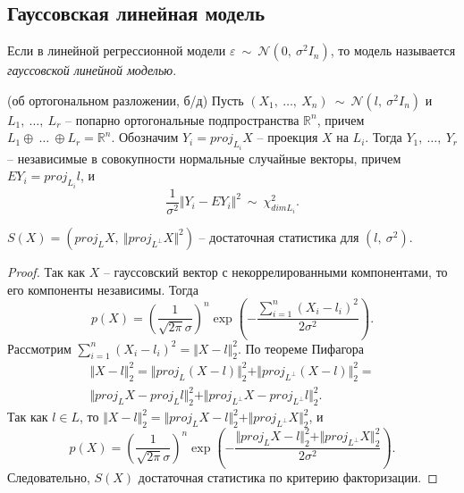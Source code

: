 \subsection{Гауссовская линейная модель}
\begin{definition}
    Если в линейной регрессионной модели $\displaystyle \varepsilon \ \sim \ \mathcal{N}\left( 0,\ \sigma ^{2} I_{n}\right)$, то модель называется \textit{гауссовской линейной моделью}.
\end{definition}
\begin{theorem}
    (об ортогональном разложении, б/д) Пусть $\displaystyle ( X_{1} ,\ \dotsc ,\ X_{n}) \ \sim \ \mathcal{N}\left( l,\ \sigma ^{2} I_{n}\right)$ и $\displaystyle L_{1} ,\ \dotsc ,\ L_{r}$ -- попарно ортогональные подпространства $\displaystyle \mathbb{R}^{n}$, причем $\displaystyle L_{1} \oplus \ \dotsc \ \oplus L_{r} =\mathbb{R}^{n}$. Обозначим $\displaystyle Y_{i} =proj_{L_{i}} X$ -- проекция $\displaystyle X$ на $\displaystyle L_{i}$. Тогда $\displaystyle Y_{1} ,\ \dotsc ,\ Y_{r}$ -- независимые в совокупности нормальные случайные векторы, причем $\displaystyle EY_{i} =proj_{L_{i}} l$, и
    \begin{equation*}
        \dfrac{1}{\sigma ^{2}}\Vert Y_{i} -EY_{i}\Vert ^{2} \ \sim \ \chi _{dimL_{i}}^{2} .
    \end{equation*}
\end{theorem}
\begin{proposition}
    $\displaystyle S( X) =\left( proj_{L} X,\ \Vert proj_{L^{\perp }} X\Vert ^{2}\right)$ -- достаточная статистика для $\displaystyle \left( l,\ \sigma ^{2}\right)$.
\end{proposition}
\begin{proof}
    Так как $\displaystyle X$ -- гауссовский вектор с некоррелированными компонентами, то его компоненты независимы. Тогда
    \begin{equation*}
        p( X) =\left(\dfrac{1}{\sqrt{2\pi } \sigma }\right)^{n}\exp\left( -\dfrac{\sum _{i=1}^{n}( X_{i} -l_{i})^{2}}{2\sigma ^{2}}\right) .
    \end{equation*}
    Рассмотрим $\displaystyle \sum _{i=1}^{n}( X_{i} -l_{i})^{2} =\Vert X-l\Vert _{2}^{2}$. По теореме Пифагора
    \begin{gather*}
        \Vert X-l\Vert _{2}^{2} =\Vert proj_{L}( X-l)\Vert _{2}^{2} +\Vert proj_{L^{\perp }}( X-l)\Vert _{2}^{2} =\\
        \Vert proj_{L} X-proj_{L} l\Vert _{2}^{2} +\Vert proj_{L^{\perp }} X-proj_{L^{\perp }} l\Vert _{2}^{2} .
    \end{gather*}
    Так как $\displaystyle l\in L$, то $\displaystyle \Vert X-l\Vert _{2}^{2} =\Vert proj_{L} X-l\Vert _{2}^{2} +\Vert proj_{L^{\perp }} X\Vert _{2}^{2}$, и
    \begin{equation*}
        p( X) =\left(\dfrac{1}{\sqrt{2\pi } \sigma }\right)^{n}\exp\left( -\dfrac{\Vert proj_{L} X-l\Vert _{2}^{2} +\Vert proj_{L^{\perp }} X\Vert _{2}^{2}}{2\sigma ^{2}}\right) .
    \end{equation*}
    Следовательно, $\displaystyle S( X)$ достаточная статистика по критерию факторизации.
\end{proof}

